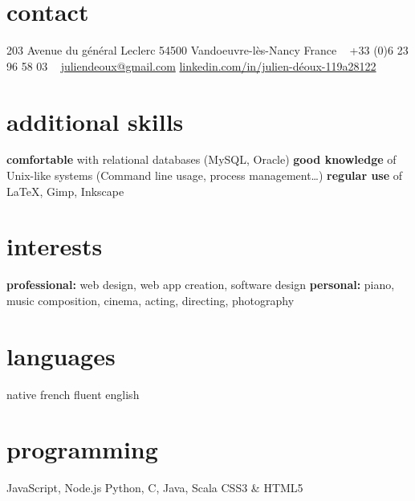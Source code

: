 \documentclass[]{lemaki-cv}
\begin{document}


	\begin{aside} %
		\section{contact}
		{\footnotesize 203 Avenue du général Leclerc
		54500 Vandoeuvre-lès-Nancy
		France}
		~
		{\footnotesize +33 (0)6 23 96 58 03}
		~
		\href{mailto:juliendeoux@gmail.com}{\footnotesize juliendeoux@gmail.com}
		\href{https://www.linkedin.com/in/julien-déoux-119a28122}{\footnotesize linkedin.com/in/julien-déoux-119a28122}
		\section{additional skills}
		\footnotesize\textbf{comfortable} with relational databases (MySQL, Oracle)
		\footnotesize\textbf{good knowledge} of Unix-like systems (Command line usage, process
		management\ldots)
		\footnotesize\textbf{regular use} of LaTeX, Gimp, Inkscape
		\section{interests}
		\footnotesize\textbf{professional:} web design, web app creation, software design
		\footnotesize\textbf{personal:} piano, music composition, cinema, acting, directing, photography
		\section{languages}
		\footnotesize native french
		\footnotesize fluent english
		\section{programming}
		\footnotesize JavaScript, Node.js
		\footnotesize Python, C, Java, Scala
		\footnotesize CSS3 \& HTML5
	\end{aside}
\end{document}
